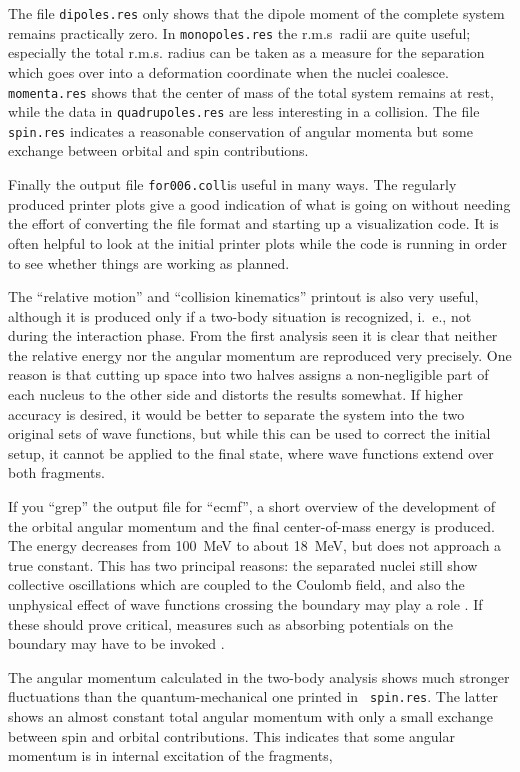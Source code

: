 \documentclass[A4]{elsarticle}
\begin{document}
The file {\tt dipoles.res} only shows that the dipole moment of the
complete system remains practically zero. In {\tt monopoles.res} the
r.m.s\ radii are quite useful; especially the total r.m.s. radius can
be taken as a measure for the separation which goes over into a
deformation coordinate when the nuclei coalesce. {\tt momenta.res}
shows that the center of mass of the total system remains at rest,
while the data in {\tt quadrupoles.res} are less interesting in a
collision. The file {\tt spin.res} indicates a reasonable conservation
of angular momenta but some exchange between orbital and spin
contributions. 

Finally the output file {\tt for006.coll}is useful in many ways. The
regularly produced printer plots give a good indication of what is going
on without needing the effort of converting the file format and
starting up a visualization code. It is often helpful to look at the
initial printer plots while the code is running in order to see
whether things are working as planned.

The ``relative motion'' and ``collision kinematics'' printout is also
very useful, although it is produced only if a two-body situation is
recognized, i.~e., not during the interaction phase. From the first
analysis seen it is clear that neither the relative energy nor the
angular momentum are reproduced very precisely. One reason is that
cutting up space into two halves assigns a non-negligible part of each
nucleus to the other side and distorts the results somewhat. If higher
accuracy is desired, it would be better to separate the system into the
two original sets of wave functions, but while this can be used to
correct the initial setup, it cannot be applied to the final state,
where wave functions extend over both fragments.

If you ``grep'' the output file for ``ecmf'', a short overview of the
development of the orbital angular momentum and the final center-of-mass
energy is produced. The energy decreases from 100~MeV to about 18~MeV,
but does not approach a true constant. This has two principal reasons:
the separated nuclei still  show collective oscillations which are
coupled to the Coulomb field, and also the unphysical effect of
wave functions crossing the boundary may play a role \cite{guo}. 
 If these should prove critical, measures such as
absorbing potentials on the boundary may have to be invoked
\cite{absorb}.

The angular momentum calculated in the two-body analysis shows much
stronger fluctuations than the quantum-mechanical one printed in {\tt
  spin.res}. The latter shows an almost constant total angular
momentum with only a small exchange between spin and orbital
contributions. This indicates that some angular momentum is in
internal excitation of the fragments,
\end{document}

